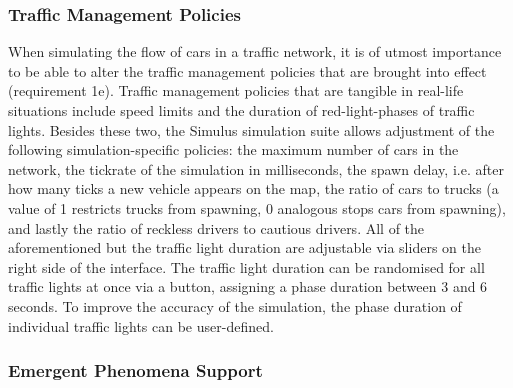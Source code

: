 \subsubsection*{Traffic Management Policies}

When simulating the flow of cars in a traffic network, it is of utmost importance to be able to alter the traffic management policies that are brought into effect (requirement 1e). Traffic management policies that are tangible in real-life situations include speed limits and the duration of red-light-phases of traffic lights. Besides these two, the Simulus simulation suite allows adjustment of the following simulation-specific policies: the maximum number of cars in the network, the tickrate of the simulation in milliseconds, the spawn delay, i.e. after how many ticks a new vehicle appears on the map, the ratio of cars to trucks (a value of 1 restricts trucks from spawning, 0 analogous stops cars from spawning), and lastly the ratio of reckless drivers to cautious drivers. All of the aforementioned but the traffic light duration are adjustable via sliders on the right side of the interface. The traffic light duration can be randomised for all traffic lights at once via a button, assigning a phase duration between 3 and 6 seconds. To improve the accuracy of the simulation, the phase duration of individual traffic lights can be user-defined.

\subsubsection*{Emergent Phenomena Support}

